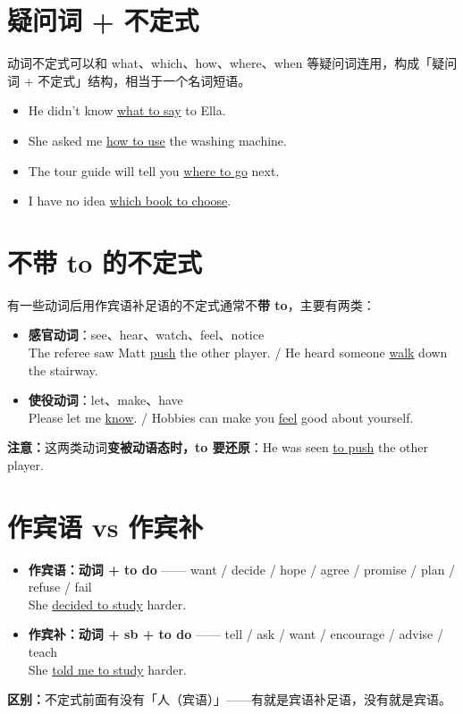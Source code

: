 \documentclass[11pt,a4paper]{ctexart}
\begin{document}
\section{疑问词 + 不定式}
动词不定式可以和 what、which、how、where、when 等疑问词连用，构成「疑问词 + 不定式」结构，相当于一个名词短语。
\begin{itemize}[leftmargin=1.4em]
\item He didn't know \underline{what to say} to Ella.
\item She asked me \underline{how to use} the washing machine.
\item The tour guide will tell you \underline{where to go} next.
\item I have no idea \underline{which book to choose}.
\end{itemize}

\section{不带 to 的不定式}
有一些动词后用作宾语补足语的不定式通常不\textbf{带 to}，主要有两类：
\begin{itemize}[leftmargin=1.4em]
\item \textbf{感官动词}：see、hear、watch、feel、notice\\
The referee saw Matt \underline{push} the other player. / He heard someone \underline{walk} down the stairway.
\item \textbf{使役动词}：let、make、have\\
Please let me \underline{know}. / Hobbies can make you \underline{feel} good about yourself.
\end{itemize}
\textbf{注意：}这两类动词\textbf{变被动语态时，to 要还原}：He was seen \underline{to push} the other player.

\section{作宾语 vs 作宾补}
\begin{itemize}[leftmargin=1.4em]
\item \textbf{作宾语：动词 + to do} —— want / decide / hope / agree / promise / plan / refuse / fail\\
She \underline{decided to study} harder.
\item \textbf{作宾补：动词 + sb + to do} —— tell / ask / want / encourage / advise / teach\\
She \underline{told me to study} harder.
\end{itemize}
\textbf{区别：}不定式前面有没有「人（宾语）」——有就是宾语补足语，没有就是宾语。
\end{document}
